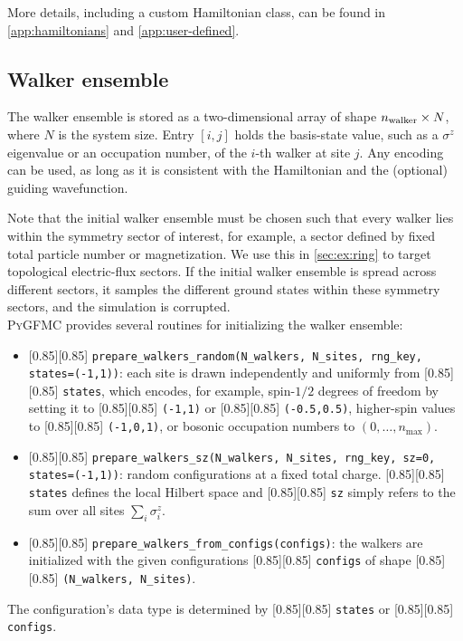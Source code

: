 \documentclass{SciPost}
\newcommand{\pyinline}[1]{\begingroup\setlength{\fboxsep}{0pt}%
  \colorbox{gray!15}{\raisebox{0pt}[0.85\ht\strutbox][0.85\dp\strutbox]{%
    \hspace{1pt}\lstinline{#1}\hspace{1pt}}}\endgroup}
\newcommand{\nwalker}{n_{\rm walker}}
\providecommand{\PyGFMC}{\textsc{PyGFMC}}
\begin{document}
More details, including a custom Hamiltonian class, can be found in \autoref{app:hamiltonians} and \autoref{app:user-defined}.\\

\subsection{Walker ensemble}\label{sec:pkg:walker}
The walker ensemble is stored as a two-dimensional array of shape $\nwalker \times N$, where $N$ is the system size.
%
Entry $[i, j]$ holds the basis-state value, such as a $\sigma^z$ eigenvalue or an occupation number, of the $i$-th walker at site $j$.
%
Any encoding can be used, as long as it is consistent with the Hamiltonian and the (optional) guiding wavefunction.

Note that the initial walker ensemble must be chosen such that every walker lies within the symmetry sector of interest, for example, a sector defined by fixed total particle number or magnetization.
%
We use this in \autoref{sec:ex:ring} to target topological electric-flux sectors.
%
If the initial walker ensemble is spread across different sectors, it samples the different ground states within these symmetry sectors, and the simulation is corrupted.\\

\PyGFMC{} provides several routines for initializing the walker ensemble:
\begin{itemize}
\item \pyinline{prepare_walkers_random(N_walkers, N_sites, rng_key, states=(-1,1))}: each site is drawn independently and uniformly from \pyinline{states}, which encodes, for example, spin-$1/2$ degrees of freedom by setting it to \pyinline{(-1,1)} or \pyinline{(-0.5,0.5)}, higher-spin values to \pyinline{(-1,0,1)}, or bosonic occupation numbers to $(0,\ldots,n_{\max})$.
	\item \pyinline{prepare_walkers_sz(N_walkers, N_sites, rng_key, sz=0, states=(-1,1))}: random configurations at a fixed total charge.
		\pyinline{states} defines the local Hilbert space and \pyinline{sz} simply refers to the sum over all sites $\sum_i\sigma^z_i$.
	\item \pyinline{prepare_walkers_from_configs(configs)}: the walkers are initialized with the given configurations \pyinline{configs} of shape \pyinline{(N_walkers, N_sites)}.
\end{itemize}
The configuration's data type is determined by \pyinline{states} or \pyinline{configs}.
\end{document}
